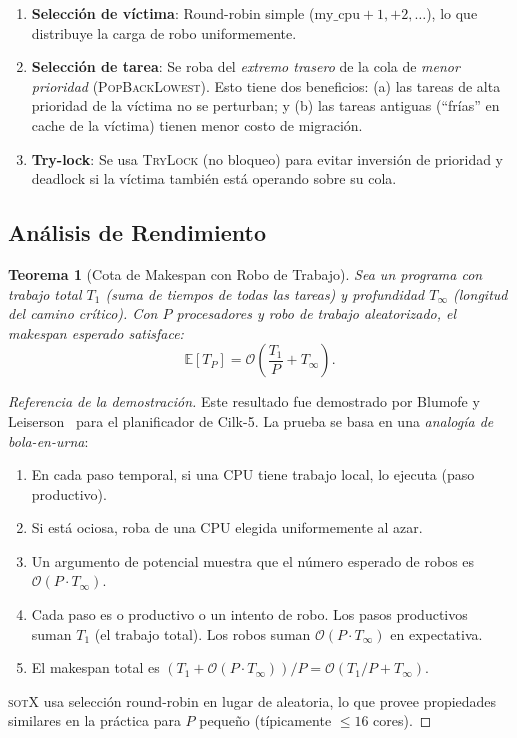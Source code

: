 \documentclass[11pt,twoside,openright]{book}
\theoremstyle{definition}
\theoremstyle{plain}
\newtheorem{theorem}{Teorema}[chapter]
\theoremstyle{remark}
\newcommand{\sotos}{\textsc{sotX}}
\newcommand{\bigO}{\mathcal{O}}
\begin{document}
\begin{enumerate}
    \item \textbf{Selección de víctima}: Round-robin simple ($\text{my\_cpu} + 1, +2, \ldots$),
          lo que distribuye la carga de robo uniformemente.
    \item \textbf{Selección de tarea}: Se roba del \emph{extremo trasero} de la cola de
          \emph{menor prioridad} (\textsc{PopBackLowest}). Esto tiene dos beneficios:
          (a) las tareas de alta prioridad de la víctima no se perturban; y
          (b) las tareas antiguas (``frías'' en cache de la víctima) tienen menor costo
          de migración.
    \item \textbf{Try-lock}: Se usa \textsc{TryLock} (no bloqueo) para evitar inversión
          de prioridad y deadlock si la víctima también está operando sobre su cola.
\end{enumerate}

\subsection{Análisis de Rendimiento}

\begin{theorem}[Cota de Makespan con Robo de Trabajo]
\label{thm:work-stealing}
Sea un programa con trabajo total $T_1$ (suma de tiempos de todas las tareas) y
profundidad $T_\infty$ (longitud del camino crítico). Con $P$ procesadores y robo de
trabajo aleatorizado, el makespan esperado satisface:
\[
    \mathbb{E}[T_P] = \bigO\!\left(\frac{T_1}{P} + T_\infty\right).
\]
\end{theorem}

\begin{proof}[Referencia de la demostración]
Este resultado fue demostrado por Blumofe y Leiserson~\cite{blumofe1999} para el
planificador de Cilk-5. La prueba se basa en una \emph{analogía de bola-en-urna}:

\begin{enumerate}
    \item En cada paso temporal, si una CPU tiene trabajo local, lo ejecuta (paso productivo).
    \item Si está ociosa, roba de una CPU elegida uniformemente al azar.
    \item Un argumento de potencial muestra que el número esperado de robos es
          $\bigO(P \cdot T_\infty)$.
    \item Cada paso es o productivo o un intento de robo. Los pasos productivos suman
          $T_1$ (el trabajo total). Los robos suman $\bigO(P \cdot T_\infty)$ en expectativa.
    \item El makespan total es $(T_1 + \bigO(P \cdot T_\infty)) / P =
          \bigO(T_1/P + T_\infty)$.
\end{enumerate}

\sotos{} usa selección round-robin en lugar de aleatoria, lo que provee propiedades
similares en la práctica para $P$ pequeño (típicamente $\leq 16$ cores).
\end{proof}
\end{document}
